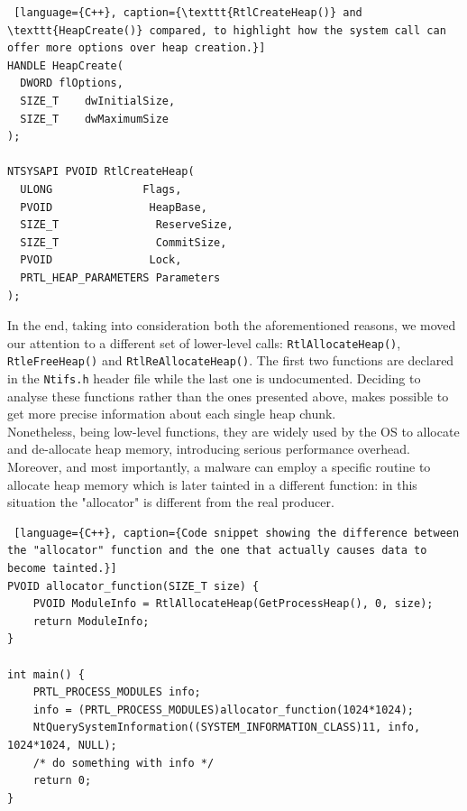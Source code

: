 \documentclass[LaM,binding=0.6cm]{sapthesis}
\begin{document}
\begin{lstlisting} [language={C++}, caption={\texttt{RtlCreateHeap()} and \texttt{HeapCreate()} compared, to highlight how the system call can offer more options over heap creation.}]
HANDLE HeapCreate(
  DWORD	flOptions,
  SIZE_T 	dwInitialSize,
  SIZE_T 	dwMaximumSize
);

NTSYSAPI PVOID RtlCreateHeap(
  ULONG              Flags,
  PVOID               HeapBase,
  SIZE_T               ReserveSize,
  SIZE_T               CommitSize,
  PVOID               Lock,
  PRTL_HEAP_PARAMETERS Parameters
);
\end{lstlisting}

In the end, taking into consideration both the aforementioned reasons, we moved our attention to a different set of lower-level calls: \texttt{RtlAllocateHeap()}, \texttt{RtleFreeHeap()} and \texttt{RtlReAllocateHeap()}. The first two functions are declared in the \texttt{Ntifs.h} header\cite{Ntifshhe84:online} file while the last one is undocumented. Deciding to analyse these functions rather than the ones presented above, makes possible to get more precise information about each single heap chunk.\\
Nonetheless, being low-level functions, they are widely used by the OS to allocate and de-allocate heap memory, introducing serious performance overhead. Moreover, and most importantly, a malware can employ a specific routine to allocate heap memory which is later tainted in a different function: in this situation the "allocator" is different from the real producer.

\begin{lstlisting} [language={C++}, caption={Code snippet showing the difference between the "allocator" function and the one that actually causes data to become tainted.}]
PVOID allocator_function(SIZE_T size) {
	PVOID ModuleInfo = RtlAllocateHeap(GetProcessHeap(), 0, size);
	return ModuleInfo;
}

int main() {
	PRTL_PROCESS_MODULES info;
	info = (PRTL_PROCESS_MODULES)allocator_function(1024*1024);
	NtQuerySystemInformation((SYSTEM_INFORMATION_CLASS)11, info, 1024*1024, NULL);
	/* do something with info */
	return 0;
}
\end{lstlisting}
\end{document}
